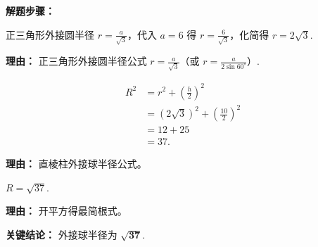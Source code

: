\begin{examplebox}
	\textbf{\textcolor{CExample}{解题步骤：}}
	\begin{description}[style=nextline, leftmargin=2.8em, labelsep=0.5em, itemsep=0.45em]
		\item[\textbf{第一步（求底面外接圆半径）：}] 正三角形外接圆半径 $r = \frac{a}{\sqrt{3}}$，代入 $a=6$ 得 $r = \frac{6}{\sqrt{3}}$，化简得 $r = 2\sqrt{3}$.
			\par\textbf{理由：} 正三角形外接圆半径公式 $r = \frac{a}{\sqrt{3}}$（或 $r = \frac{a}{2\sin 60^\circ}$）.
		\item[\textbf{第二步（套用公式）：}]
			\[
				\begin{aligned}
					R^2 &= r^2 + \left(\frac{h}{2}\right)^2 \\
					&= (2\sqrt{3})^2 + \left(\frac{10}{2}\right)^2 \\
					&= 12 + 25 \\
					&= 37.
			\end{aligned}
			\]
			\par\textbf{理由：} 直棱柱外接球半径公式。
		\item[\textbf{第三步（求半径）：}] $R = \sqrt{37}$.
			\par\textbf{理由：} 开平方得最简根式。
	\end{description}

	\textbf{\textcolor{CExample}{关键结论：}}
	外接球半径为 $\mathbf{\sqrt{37}}$.
\end{examplebox}
